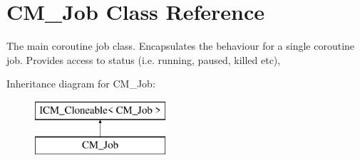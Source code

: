 \hypertarget{class_c_m___job}{}\section{C\+M\+\_\+\+Job Class Reference}
\label{class_c_m___job}


The main coroutine job class. Encapsulates the behaviour for a single coroutine job. Provides access to status (i.\+e. running, paused, killed etc),  


Inheritance diagram for C\+M\+\_\+\+Job\+:\begin{figure}[H]
\begin{center}
\leavevmode
\includegraphics[height=2.000000cm]{class_c_m___job}
\end{center}
\end{figure}
